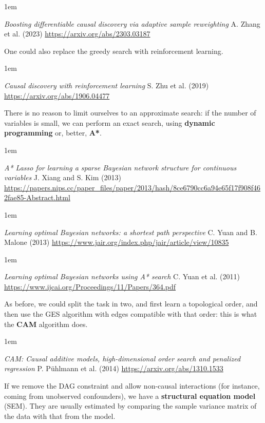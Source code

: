 \documentclass[a5paper]{article}
\let\d\textbf
\newenvironment{reference}{%
  \medskip\goodbreak
  \parskip 0pt
  \raggedright
  \leftskip 1em
  \obeylines
}{\par\medskip\goodbreak}
\begin{document}
\begin{reference}
  \emph{Boosting differentiable causal discovery  via adaptive sample reweighting}
  A. Zhang et al. (2023)
  \url{https://arxiv.org/abs/2303.03187}
\end{reference}

One could also replace the greedy search with reinforcement learning.

\begin{reference}
  \emph{Causal discovery with reinforcement learning}
  S. Zhu et al. (2019)
  \url{https://arxiv.org/abs/1906.04477}
\end{reference}

There is no reason to limit ourselves to an approximate search:
if the number of variables is small, we can perform an exact search,
using \d{dynamic programming} or, better, \d{A*}.

\begin{reference}
  \emph{A* Lasso for learning a sparse Bayesian network structure for continuous variables}
  J. Xiang and S. Kim (2013)
  \url{https://papers.nips.cc/paper_files/paper/2013/hash/8ce6790cc6a94e65f17f908f462fae85-Abstract.html}
\end{reference}

\begin{reference}
  \emph{Learning optimal Bayesian networks:  a shortest path perspective}
  C. Yuan and B. Malone (2013)
  \url{https://www.jair.org/index.php/jair/article/view/10835}
\end{reference}

\begin{reference}
  \emph{Learning optimal Bayesian networks  using A* search}
  C. Yuan et al. (2011)
  \url{https://www.ijcai.org/Proceedings/11/Papers/364.pdf}
\end{reference}

As before, we could split the task in two, and first learn a topological order,
and then use the GES algorithm with edges compatible with that order:
this is what the \d{CAM} algorithm does.

\begin{reference}
  \emph{CAM: Causal additive models,  high-dimensional order search  and penalized regression}
  P. Pühlmann et al. (2014)
  \url{https://arxiv.org/abs/1310.1533}
\end{reference}

If we remove the DAG constraint and allow non-causal interactions (for instance, coming from
unobserved confounders), we have a \d{structural equation model} (SEM).
They are usually estimated by comparing the sample variance matrix of the data
with that from the model.
\end{document}
